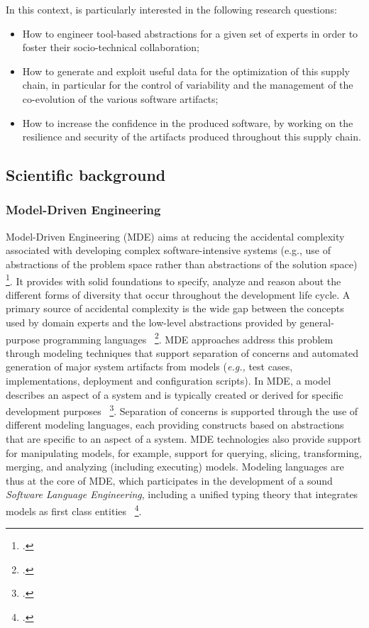 In this context, \team{} is particularly interested in the following research questions: 
\begin{itemize} 
\item How to engineer tool-based abstractions for a given set of experts in order to foster their socio-technical collaboration;
\item  How to generate and exploit useful data for the optimization of this supply chain, in particular for the control of variability and the management of the co-evolution of the various software artifacts;
\item  How to increase the confidence in the produced software, by working on the resilience and security of the artifacts produced throughout this supply chain. 
\end{itemize}


\subsection{Scientific background}
\label{fondements:sota}

\label{sec:sota}

\subsubsection{Model-Driven Engineering}    

Model-Driven Engineering (MDE) aims at reducing the accidental complexity associated with developing complex software-intensive systems (e.g., use of abstractions of the problem space rather than abstractions of the solution space)~ \footcite{Schmidt06}. It provides \team{} with solid foundations to specify, analyze and reason about the different forms of diversity that occur throughout the development life cycle. A primary source of accidental complexity is the wide gap between the concepts used by domain experts and the low-level abstractions provided by general-purpose programming languages~ \footcite{France07}. MDE approaches address this problem through  modeling techniques that support separation of concerns and automated generation of major system artifacts from models (\emph{e.g.,} test cases, implementations, deployment and configuration scripts). In MDE, a model describes an aspect of a system and is typically created or derived for specific development purposes~ \footcite{BAN04}. Separation of concerns is supported through the use of different modeling languages, each providing constructs based on abstractions that are specific to an aspect of a system. MDE technologies also provide support for manipulating models, for example, support for querying, slicing, transforming, merging, and analyzing (including executing) models. Modeling languages are thus at the core of MDE, which participates in the development of a sound \emph{Software Language Engineering}, including a unified typing theory that integrates models as first class entities~ \footcite{Steel07a}. 

